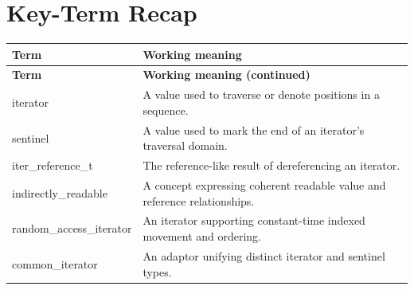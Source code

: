 \documentclass[11pt,letterpaper]{article}
\begin{document}
\section{Key-Term Recap}
\begin{longtable}{@{}>{\RaggedRight\arraybackslash}p{}>{\RaggedRight\arraybackslash}p{}@{}}\toprule\textbf{Term} & \textbf{Working meaning}\\\midrule\endfirsthead\toprule\textbf{Term} & \textbf{Working meaning (continued)}\\\midrule\endhead\bottomrule\endfoot
iterator & A value used to traverse or denote positions in a sequence.\\
sentinel & A value used to mark the end of an iterator's traversal domain.\\
iter\_\allowbreak{}reference\_\allowbreak{}t & The reference-like result of dereferencing an iterator.\\
indirectly\_\allowbreak{}readable & A concept expressing coherent readable value and reference relationships.\\
random\_\allowbreak{}access\_\allowbreak{}iterator & An iterator supporting constant-time indexed movement and ordering.\\
common\_\allowbreak{}iterator & An adaptor unifying distinct iterator and sentinel types.\\
\end{longtable}
\end{document}
